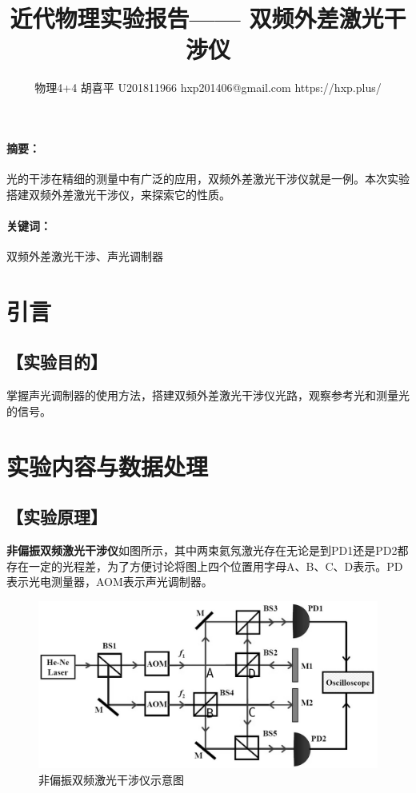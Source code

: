 \documentclass{ctexart}
\date{}
\newcommand{\generatetitle}[6]{\title{\zihao{3}\heiti#1} \author{#2 \quad
    \quad #3 \quad\quad #4 \quad\quad #5 \quad\quad #6} \maketitle\thispagestyle{fancy}}
\let\oldsubsection\subsection
\renewcommand{\subsection}[1]{\oldsubsection{\!\!\!\!\!\!【#1】}}
\let\oldparagraph\paragraph
\renewcommand{\paragraph}[1]{\oldparagraph{#1：\!\!\!\!\!\!}}
\begin{document}
\generatetitle{近代物理实验报告——
  双频外差激光干涉仪}{物理4+4}{胡喜平}{U201811966}{hxp201406@gmail.com}{https://hxp.plus/}

\paragraph{摘要}
光的干涉在精细的测量中有广泛的应用，双频外差激光干涉仪就是一例。本次实验搭建双频外差激光干涉仪，来探索它的性质。

\paragraph{关键词}
双频外差激光干涉、声光调制器

\section{引言}

\subsection{实验目的}
掌握声光调制器的使用方法，搭建双频外差激光干涉仪光路，观察参考光和测量光的信号。

\section{实验内容与数据处理}
\subsection{实验原理}

\textbf{非偏振双频激光干涉仪}如图所示，其中两束氦氖激光存在无论是到PD1还是PD2都存在一定的光程差，为了方便讨论将图上四个位置用字母A、B、C、D表示。PD表示光电测量器，AOM表示声光调制器。

\begin{figure}[H]
  \centering
  \includegraphics[width=0.9\linewidth]{figures/非偏振双频激光干涉仪}
  \caption{非偏振双频激光干涉仪示意图}
\end{figure}
\end{document}
